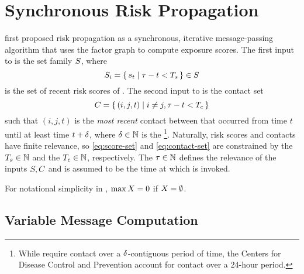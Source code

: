 \section{Synchronous Risk Propagation}\label{sec:synchronous}

\newcommand{\pDiff}{\epsilon}
\newcommand{\topK}[1]{\text{top } K \text{ of } #1}
\newcommand{\vMaxExpScore}{r}
\newcommand{\vIndexedExpScores}[2]{\vExpScores[#1]^{(#2)}}
\NewDocumentCommand{\vIndexedMaxExpScores}{om}{
  \IfValueTF{#1}
    {\vMaxExpScore_{#1}^{(#2)}}
    {\mathbf{\vMaxExpScore}^{(#2)}}
}
\newcommand{\dist}{d}

\citet{Ayday2021} first proposed risk propagation as a synchronous, iterative message-passing algorithm that uses the factor graph to compute exposure scores. The first input to \cSyncRiskProp{} is the set family $S$, where
%
\begin{equation} \label{eq:score-set}
  S_i =\set{ s_t | \tau- t < T_s} \in S
\end{equation}
%
is the set of recent risk scores of . The second input to \cSyncRiskProp{} is the contact set
%
\begin{equation} \label{eq:contact-set}
  C = \set{ (i, j, t) | i \neq j, \tau- t < T_c}
\end{equation}
%
such that $(i, j, t)$ is the \emph{most recent} contact between  that occurred from time $t$ until at least time $t + \delta$, where $\delta \in \mathbb{N}$ is the \footnote{While \citet{Ayday2021} require contact over a $\delta$-contiguous period of time, the Centers for Disease Control and Prevention \citeyearpar{CDC2021} account for contact over a 24-hour period.}. Naturally, risk scores and contacts have finite relevance, so \eqref{eq:score-set} and \eqref{eq:contact-set} are constrained by the  $T_s \in \mathbb{N}$ and the  $T_c \in \mathbb{N}$, respectively. The  $\tau \in \mathbb{N}$ defines the relevance of the inputs $S, C$ and is assumed to be the time at which \cSyncRiskProp{} is invoked.

For notational simplicity in \cSyncRiskProp{}, $\max X = 0$ if $X = \emptyset$.

\subsection{Variable Message Computation}

